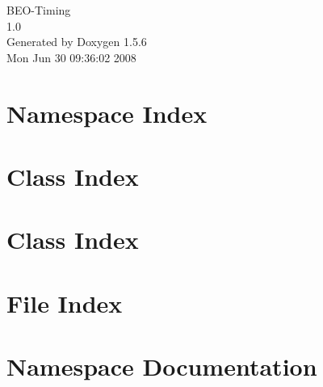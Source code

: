 \documentclass[a4paper]{book}
\begin{document}
\begin{titlepage}
\vspace*{7cm}
\begin{center}
{\Large BEO-Timing \\[1ex]\large 1.0 }\\
\vspace*{1cm}
{\large Generated by Doxygen 1.5.6}\\
\vspace*{0.5cm}
{\small Mon Jun 30 09:36:02 2008}\\
\end{center}
\end{titlepage}
\clearemptydoublepage
{}
\tableofcontents
\clearemptydoublepage
{}
\chapter{Namespace Index}

\chapter{Class Index}

\chapter{Class Index}

\chapter{File Index}

\chapter{Namespace Documentation}

\end{document}
